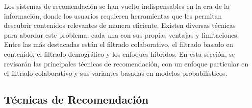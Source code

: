 \documentclass[runningheads,a4paper]{llncs}
\begin{document}
Los sistemas de recomendación se han vuelto 
indispensables en la era de la información, 
donde los usuarios requieren herramientas que les 
permitan descubrir contenidos relevantes de manera 
eficiente. Existen diversas técnicas para abordar 
este problema, cada una con sus propias ventajas y 
limitaciones. Entre las más destacadas están el 
filtrado colaborativo, el filtrado basado en contenido, 
el filtrado demográfico y los enfoques híbridos. 
En esta sección, se revisarán las principales técnicas 
de recomendación, con un enfoque particular en el 
filtrado colaborativo y sus variantes basadas en 
modelos probabilísticos.

\subsection{Técnicas de Recomendación}
\end{document}
